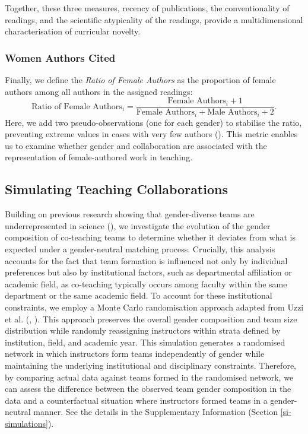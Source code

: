 \documentclass[
  11pt,
]{article}
\begin{document}
Together, these three measures, recency of publications, the conventionality of readings, and the scientific atypicality of the readings, provide a multidimensional characterisation of curricular novelty.

\subsubsection{Women Authors Cited}\label{women-authors-cited}

Finally, we define the \emph{Ratio of Female Authors} as the proportion of female authors among all authors in the assigned readings:
\[
  \text{Ratio of Female Authors}_i = \frac{\text{Female Authors}_i + 1} {\text{Female Authors}_i + \text{Male Authors}_i + 2}.
\]
Here, we add two pseudo-observations (one for each gender) to stabilise the ratio, preventing extreme values in cases with very few authors (). This metric enables us to examine whether gender and collaboration are associated with the representation of female-authored work in teaching.

\subsection{Simulating Teaching Collaborations}\label{simulating-teaching-collaborations}

Building on previous research showing that gender-diverse teams are underrepresented in science (), we investigate the evolution of the gender composition of co-teaching teams to determine whether it deviates from what is expected under a gender-neutral matching process. Crucially, this analysis accounts for the fact that team formation is influenced not only by individual preferences but also by institutional factors, such as departmental affiliation or academic field, as co-teaching typically occurs among faculty within the same department or the same academic field. To account for these institutional constraints, we employ a Monte Carlo randomisation approach adapted from Uzzi et al. (, ). This approach preserves the overall gender composition and team size distribution while randomly reassigning instructors within strata defined by institution, field, and academic year. This simulation generates a randomised network in which instructors form teams independently of gender while maintaining the underlying institutional and disciplinary constraints. Therefore, by comparing actual data against teams formed in the randomised network, we can assess the difference between the observed team gender composition in the data and a counterfactual situation where instructors formed teams in a gender-neutral manner. See the details in the Supplementary Information (Section \ref{si-simulations}).
\end{document}
